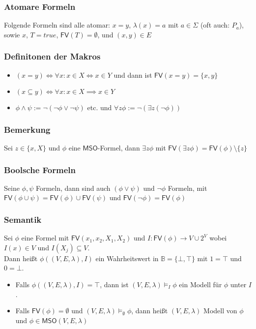 \documentclass[12pt, german]{article}
\newcommand{\B}{\mathbb{B}}
\newcommand{\fv}{\mathsf{FV}}
\newcommand{\mso}{\mathsf{MSO}}
\begin{document}
\subsubsection{Atomare Formeln}
	Folgende Formeln sind alle atomar: $x=y$, $\lambda(x) = a$ mit $a \in \Sigma$ (oft auch: $P_a$), sowie $x$, $T= true$, $\fv(T) = \emptyset$, und $(x,y) \in E$
	

	
\subsubsection{Definitonen der Makros}
\begin{itemize}
	\item $(x = y) \iff \forall x : x \in X \iff x \in Y$ und dann ist $\fv{(x = y ) = \{x,y\}}$
	\item $(x \subseteq y) \iff \forall x : x \in X \implies x \in Y$
	\item $\phi \land \psi := \neg (\neg \phi \lor \neg \psi)$ etc. und  $\forall z \phi := \neg (\exists z (\neg\phi))$
\end{itemize}

\subsubsection{Bemerkung}
	Sei $z \in \{x, X\}$ und $\phi$ eine $\mso$-Formel, dann $\exists z\phi$ mit $\fv(\exists z \phi) = \fv(\phi) \setminus \{z\}$

\subsubsection{Boolsche Formeln}
	Seine $\phi, \psi$ Formeln, dann sind auch $(\phi \lor \psi)$ und $\neg \phi$ Formeln, 
	mit $\fv(\phi \cup \psi) = \fv(\phi) \cup \fv(\psi)$ und $\fv(\neg \phi) = \fv(\phi)$

\subsubsection{Semantik}
	Sei $\phi$ eine Formel mit $\fv(x_1, x_2, X_1, X_2)$ und $I: \fv(\phi) \to V \cup 2^V$ wobei $I(x) \in V$ und $I(X_j) \subseteq V$. \\
	
	Dann heißt $\phi((V,E,\lambda), I)$ ein Wahrheitswert in $\B = \{\bot, \top\}$ mit $1 = \top$ und $0 = \bot$. 
	\begin{itemize}
		\item 	Falls $\phi((V,E,\lambda), I) = \top$, dann ist $(V,E,\lambda) \models_I \phi$ ein Modell für $\phi$ unter $I$. 
		\item	Falls $\fv(\phi) = \emptyset$ und $(V,E,\lambda) \models_{\emptyset} \phi$, dann heißt $(V,E,\lambda)$ Modell von $\phi$ und $\phi \in \mso(V,E,\lambda)$
	\end{itemize}
\end{document}

